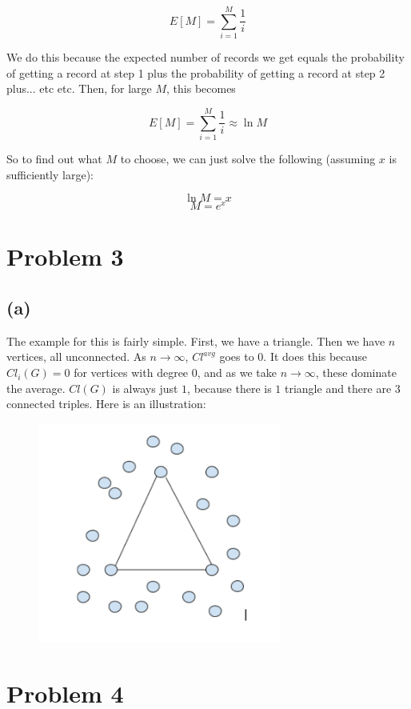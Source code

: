 \documentclass{article}
\begin{document}
\[ E[M] = \sum_{i = 1}^M \frac{1}{i} \]

\noindent We do this because the expected number of records we get equals the 
probability of getting a record at step 1 plus the probability of getting a 
record at step 2 plus... etc etc. Then, for large $M$, this becomes

\[ E[M] = \sum_{i = 1}^M \frac{1}{i} \approx \ln M \]

\noindent So to find out what $M$ to choose, we can just solve the following (assuming
$x$ is sufficiently large):

\[ \ln M = x \]
\[ M = e^x \]

\section*{Problem 3}
\subsection*{(a)}
The example for this is fairly simple. First, we have a triangle. Then we
have $n$ vertices, all unconnected. As $n \rightarrow \infty$, $Cl^{avg}$ goes to
$0$. It does this because $Cl_i(G) = 0$ for vertices with degree 0, and as we take
$n \rightarrow \infty$, these dominate the average. $Cl(G)$ is always just $1$, 
because there is $1$ triangle and there are $3$ connected triples. Here is an illustration:

\begin{figure}[h]
    \includegraphics[width=8cm]{graph2}
\end{figure}

\section*{Problem 4}
\end{document}
